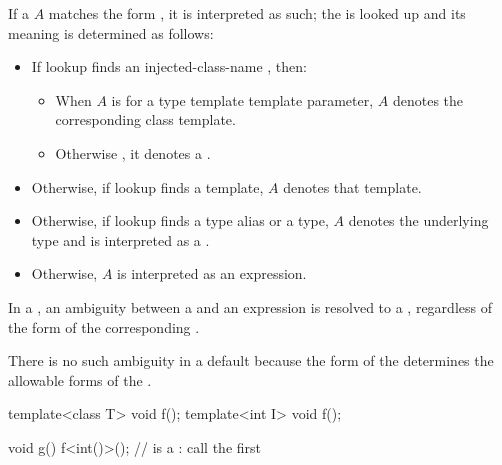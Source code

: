 \documentclass{wg21}
\begin{document}
\pnum
If a  $A$
matches the form ,
it is interpreted as such;
the  is looked up
and its meaning is determined as follows:
\begin{itemize}
    \item
    If lookup finds an injected-class-name , then:
    \begin{itemize}
        \item
        When $A$ is for a type template template parameter,
        $A$ denotes the corresponding class template.
        \item
        Otherwise , it denotes a .
    \end{itemize}
    \item
    Otherwise, if lookup finds a template,
    $A$ denotes that template.
    \item
    Otherwise, if lookup finds a type alias or a type,
    $A$ denotes the underlying type and is interpreted as a .
    \item
    Otherwise, $A$ is interpreted as an expression.
\end{itemize}

\pnum
In a
,
an ambiguity between a
and an expression is resolved to a
,
regardless of the form of the corresponding
.
\begin{footnote}
    There is no such ambiguity in a default
    because the form of the
    determines the allowable forms of the
    .
\end{footnote}
\begin{example}
    \begin{codeblock}
        template<class T> void f();
        template<int I> void f();

        void g() {
            f<int()>();       //  is a : call the first 
        }
    \end{codeblock}
\end{example}
\end{document}
